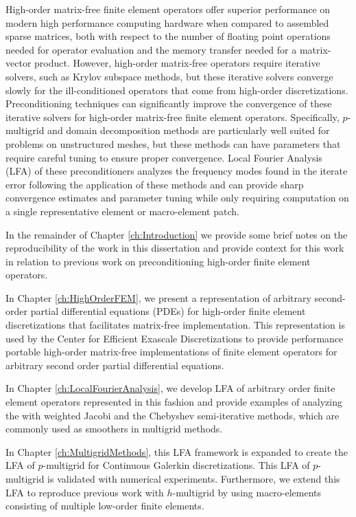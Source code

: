 High-order matrix-free finite element operators offer superior performance on modern high performance computing hardware when compared to assembled sparse matrices, both with respect to the number of floating point operations needed for operator evaluation and the memory transfer needed for a matrix-vector product.
However, high-order matrix-free operators require iterative solvers, such as Krylov subspace methods, but these iterative solvers converge slowly for the ill-conditioned operators that come from high-order discretizations.
Preconditioning techniques can significantly improve the convergence of these iterative solvers for high-order matrix-free finite element operators.
Specifically, $p$-multigrid and domain decomposition methods are particularly well suited for problems on unstructured meshes, but these methods can have parameters that require careful tuning to ensure proper convergence.
Local Fourier Analysis (LFA) of these preconditioners analyzes the frequency modes found in the iterate error following the application of these methods and can provide sharp convergence estimates and parameter tuning while only requiring computation on a single representative element or macro-element patch.

In the remainder of Chapter \ref{ch:Introduction} we provide some brief notes on the reproducibility of the work in this dissertation and provide context for this work in relation to previous work on preconditioning high-order finite element operators.

In Chapter \ref{ch:HighOrderFEM}, we present a representation of arbitrary second-order partial differential equations (PDEs) for high-order finite element discretizations that facilitates matrix-free implementation.
This representation is used by the Center for Efficient Exascale Discretizations to provide performance portable high-order matrix-free implementations of finite element operators for arbitrary second order partial differential equations.

In Chapter \ref{ch:LocalFourierAnalysis}, we develop LFA of arbitrary order finite element operators represented in this fashion and provide examples of analyzing the with weighted Jacobi and the Chebyshev semi-iterative methods, which are commonly used as smoothers in multigrid methods.

In Chapter \ref{ch:MultigridMethods}, this LFA framework is expanded to create the LFA of $p$-multigrid for Continuous Galerkin discretizations.
This LFA of $p$-multigrid is validated with numerical experiments.
Furthermore, we extend this LFA to reproduce previous work with $h$-multigrid by using macro-elements consisting of multiple low-order finite elements.

